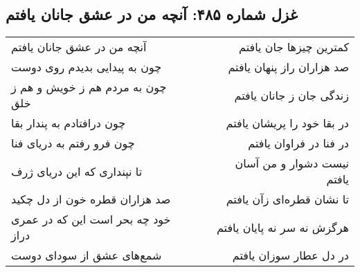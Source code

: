 \begin{center}
\section*{غزل شماره ۴۸۵: آنچه من در عشق جانان یافتم}
\label{sec:485}
\begin{longtable}{l p{0.5cm} r}
آنچه من در عشق جانان یافتم
&&
کمترین چیزها جان یافتم
\\
چون به پیدایی بدیدم روی دوست
&&
صد هزاران راز پنهان یافتم
\\
چون به مردم هم ز خویش و هم ز خلق
&&
زندگی جان ز جانان یافتم
\\
چون درافتادم به پندار بقا
&&
در بقا خود را پریشان یافتم
\\
چون فرو رفتم به دریای فنا
&&
در فنا در فراوان یافتم
\\
تا نپنداری که این دریای ژرف
&&
نیست دشوار و من آسان یافتم
\\
صد هزاران قطره خون از دل چکید
&&
تا نشان قطره‌ای زآن یافتم
\\
خود چه بحر است این که در عمری دراز
&&
هرگزش نه سر نه پایان یافتم
\\
شمع‌های عشق از سودای دوست
&&
در دل عطار سوزان یافتم
\\
\end{longtable}
\end{center}
